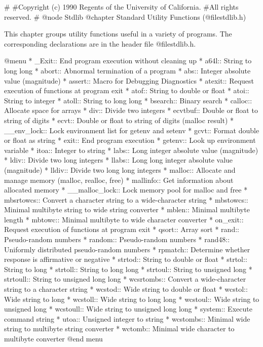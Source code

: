 #
#Copyright (c) 1990 Regents of the University of California.
#All rights reserved.
#
@node Stdlib
@chapter Standard Utility Functions (@file{stdlib.h})

This chapter groups utility functions useful in a variety of programs.
The corresponding declarations are in the header file @file{stdlib.h}.

@menu 
* _Exit::       End program execution without cleaning up
* a64l::        String to long long
* abort::       Abnormal termination of a program
* abs::         Integer absolute value (magnitude)
* assert::      Macro for Debugging Diagnostics
* atexit::      Request execution of functions at program exit
* atof::        String to double or float
* atoi::        String to integer
* atoll::       String to long long
* bsearch::	Binary search
* calloc::      Allocate space for arrays
* div::         Divide two integers
* ecvtbuf::     Double or float to string of digits
* ecvt::        Double or float to string of digits (malloc result)
* __env_lock::		Lock environment list for getenv and setenv
* gcvt::        Format double or float as string
* exit::        End program execution
* getenv::      Look up environment variable
* itoa::        Integer to string
* labs::        Long integer absolute value (magnitude)
* ldiv::        Divide two long integers
* llabs::       Long long integer absolute value (magnitude)
* lldiv::       Divide two long long integers
* malloc::      Allocate and manage memory (malloc, realloc, free)
* mallinfo::	Get information about allocated memory
* __malloc_lock::	Lock memory pool for malloc and free
* mbsrtowcs::	Convert a character string to a wide-character string
* mbstowcs::	Minimal multibyte string to wide string converter
* mblen::	Minimal multibyte length
* mbtowc::      Minimal multibyte to wide character converter
* on_exit::     Request execution of functions at program exit
* qsort::	Array sort
* rand::        Pseudo-random numbers
* random::      Pseudo-random numbers
* rand48::      Uniformly distributed pseudo-random numbers
* rpmatch::     Determine whether response is affirmative or negative
* strtod::      String to double or float
* strtol::      String to long
* strtoll::     String to long long
* strtoul::     String to unsigned long
* strtoull::    String to unsigned long long
* wcsrtombs::	Convert a wide-character string to a character string
* wcstod::      Wide string to double or float
* wcstol::      Wide string to long
* wcstoll::     Wide string to long long
* wcstoul::     Wide string to unsigned long
* wcstoull::    Wide string to unsigned long long
* system::      Execute command string
* utoa::        Unsigned integer to string
* wcstombs::	Minimal wide string to multibyte string converter
* wctomb::      Minimal wide character to multibyte converter
@end menu

